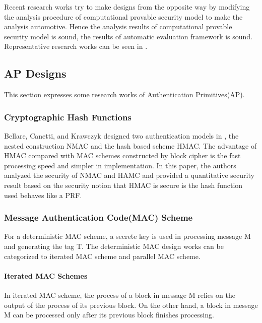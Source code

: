 \documentclass{article}
\begin{document}
Recent research works try to make designs from the opposite way by modifying the analysis procedure of computational provable security model to make the analysis automotive. Hence the analysis results of computational provable security model is sound, the results of automatic evaluation framework is sound. Representative research works can be seen in \cite{com-indis-log,auto-proof,mech-prover}.

\subsection{AP Designs} 
This section expresses some research works of Authentication Primitives(AP).
\subsubsection{Cryptographic Hash Functions}
Bellare, Canetti, and Krawczyk designed two authentication models in \cite{hmac}, the nested construction NMAC and the hash based scheme HMAC. The advantage of HMAC compared with MAC schemes constructed by block cipher is the fast processing speed and simpler in implementation. 
In this paper, the authors analyzed the security of NMAC and HAMC and provided a quantitative security result based on the security notion that HMAC is secure is the hash function used behaves like a PRF.  

\subsubsection{Message Authentication Code(MAC) Scheme}
For a deterministic MAC scheme, a secrete key is used in processing message M and generating the tag T. The deterministic MAC design works can be categorized to iterated MAC scheme and parallel MAC scheme.
\paragraph{Iterated MAC Schemes}
In iterated MAC scheme, the process of a block in message M relies on the output of the process of its previous block. On the other hand, a block in message M can be processed only after its previous block finishes processing. 
\end{document}
